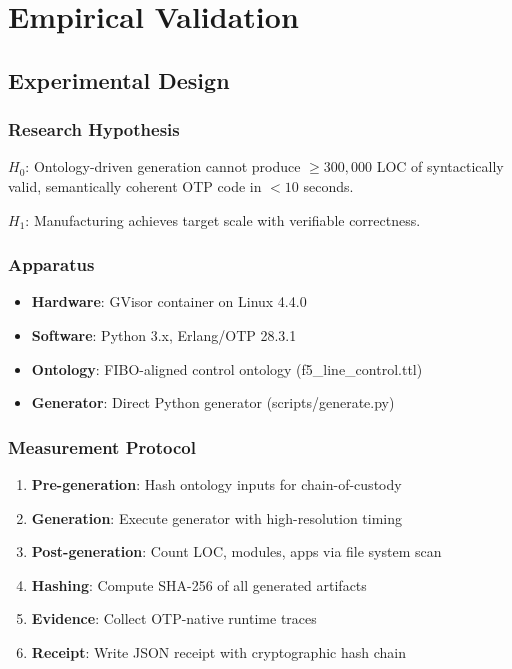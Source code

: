 \chapter{Empirical Validation}
\label{ch:empirical}

\section{Experimental Design}

\subsection{Research Hypothesis}

$H_0$: Ontology-driven generation cannot produce $\geq 300,000$ LOC of syntactically valid, semantically coherent OTP code in $< 10$ seconds.

$H_1$: Manufacturing achieves target scale with verifiable correctness.

\subsection{Apparatus}

\begin{itemize}
    \item \textbf{Hardware}: GVisor container on Linux 4.4.0
    \item \textbf{Software}: Python 3.x, Erlang/OTP 28.3.1
    \item \textbf{Ontology}: FIBO-aligned control ontology (f5\_line\_control.ttl)
    \item \textbf{Generator}: Direct Python generator (scripts/generate.py)
\end{itemize}

\subsection{Measurement Protocol}

\begin{enumerate}
    \item \textbf{Pre-generation}: Hash ontology inputs for chain-of-custody
    \item \textbf{Generation}: Execute generator with high-resolution timing
    \item \textbf{Post-generation}: Count LOC, modules, apps via file system scan
    \item \textbf{Hashing}: Compute SHA-256 of all generated artifacts
    \item \textbf{Evidence}: Collect OTP-native runtime traces
    \item \textbf{Receipt}: Write JSON receipt with cryptographic hash chain
\end{enumerate}


